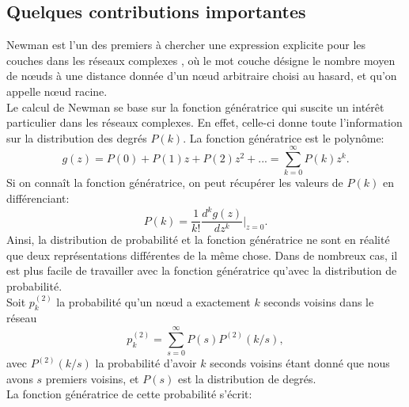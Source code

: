\subsection{Quelques contributions importantes}
Newman est l'un des premiers à chercher une expression explicite pour les couches dans les réseaux complexes \cite{Newman2010-456}, où le mot couche désigne le nombre moyen de nœuds à une distance donnée d'un nœud arbitraire choisi au hasard, et qu'on appelle nœud racine.\\
Le calcul de Newman se base sur la fonction génératrice qui suscite un intérêt particulier dans les réseaux complexes. En effet, celle-ci donne toute l'information sur la distribution des degrés $P(k)$. La fonction génératrice est le polynôme:
\begin{equation}
g(z)=P(0)+P(1)z+P(2)z^2+...=\sum_{k=0}^{\infty}P(k)z^k.
\end{equation}
Si on connaît la fonction génératrice, on peut récupérer les valeurs de $P(k)$ en différenciant:
\begin{equation}
P(k)=\frac{1}{k!}\frac{d^kg(z)}{dz^k}\Big\lvert_{z=0}.
\end{equation}
Ainsi, la distribution de probabilité et la fonction génératrice ne sont en réalité que deux représentations différentes de la même chose. Dans de nombreux cas, il est plus facile de travailler avec la fonction génératrice qu'avec la distribution de probabilité.\\
Soit $p_k^{(2)}$ la probabilité qu'un nœud a exactement $k$ seconds voisins dans le réseau
\begin{equation}
p_k^{(2)}=\sum_{s=0}^{\infty}P(s)P^{(2)}(k/s),
\end{equation}
avec $P^{(2)}(k/s)$ la probabilité d'avoir $k$ seconds voisins étant donné que nous avons $s$ premiers voisins, et $P(s)$ est la distribution de degrés.\\
La fonction génératrice de cette probabilité s'écrit:

